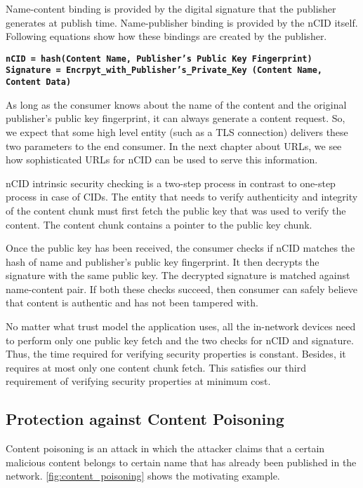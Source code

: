 Name-content binding is provided by the digital signature that the
publisher generates at publish time. Name-publisher binding is
provided by the nCID itself. Following equations show how these
bindings are created by the publisher.
\begin{center}
\texttt{\textbf{nCID = hash(Content Name, Publisher's Public Key Fingerprint)}}\\
\texttt{\textbf{Signature = Encrpyt\_with\_Publisher's\_Private\_Key (Content Name, Content Data)}}\\
\end{center}
As long as the consumer knows about the name of the content and the
original publisher's public key fingerprint, it can always generate a
content request. So, we expect that some high level entity (such as a
TLS connection) delivers these two parameters to the end consumer. In
the next chapter about URLs, we see how sophisticated URLs for nCID
can be used to serve this information.

nCID intrinsic security checking is a two-step process in contrast to
one-step process in case of CIDs. The entity that needs to verify
authenticity and integrity of the content chunk must first fetch the
public key that was used to verify the content. The content chunk
contains a pointer to the public key chunk.

Once the public key has been received, the consumer checks if nCID
matches the hash of name and publisher’s public key fingerprint. It
then decrypts the signature with the same public key. The decrypted
signature is matched against name-content pair. If both these checks
succeed, then consumer can safely believe that content is authentic
and has not been tampered with.

No matter what trust model the application uses, all the in-network
devices need to perform only one public key fetch and the two checks
for nCID and signature. Thus, the time required for verifying security
properties is constant. Besides, it requires at most only one content
chunk fetch. This satisfies our third requirement of verifying
security properties at minimum cost.

\subsection{Protection against Content Poisoning}
Content poisoning is an attack in which the attacker claims that a
certain malicious content belongs to certain name that has already
been published in the network. \ref{fig:content_poisoning} shows the
motivating example.


